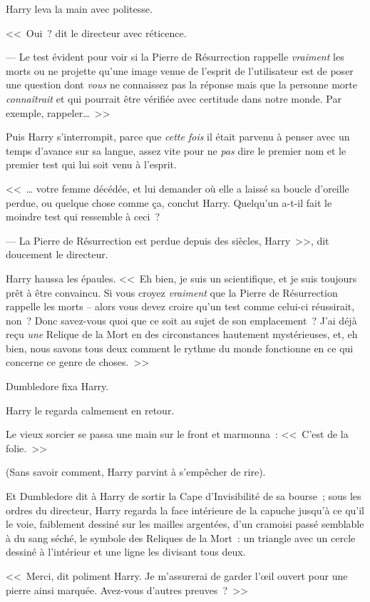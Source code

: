 Harry leva la main avec politesse.

<<~Oui~? dit le directeur avec réticence.

--- Le test évident pour voir si la Pierre de Résurrection rappelle \emph{vraiment} les morts ou ne projette qu'une image venue de l'esprit de l'utilisateur est de poser une question dont \emph{vous} ne connaissez pas la réponse mais que la personne morte \emph{connaîtrait} et qui pourrait être vérifiée avec certitude dans notre monde. Par exemple, rappeler…~>>

Puis Harry s'interrompit, parce que \emph{cette fois} il était parvenu à penser avec un temps d'avance sur sa langue, assez vite pour ne \emph{pas} dire le premier nom et le premier test qui lui soit venu à l'esprit.

<<~… votre femme décédée, et lui demander où elle a laissé sa boucle d'oreille perdue, ou quelque chose comme ça, conclut Harry. Quelqu'un a-t-il fait le moindre test qui ressemble à ceci~?

--- La Pierre de Résurrection est perdue depuis des siècles, Harry~>>, dit doucement le directeur.

Harry haussa les épaules. <<~Eh bien, je suis un scientifique, et je suis toujours prêt à être convaincu. Si vous croyez \emph{vraiment} que la Pierre de Résurrection rappelle les morts -- alors vous devez croire qu'un test comme celui-ci réussirait, non~? Donc savez-vous quoi que ce soit au sujet de son emplacement~? J'ai déjà reçu \emph{une} Relique de la Mort en des circonstances hautement mystérieuses, et, eh bien, nous savons tous deux comment le rythme du monde fonctionne en ce qui concerne ce genre de choses.~>>

Dumbledore fixa Harry.

Harry le regarda calmement en retour.

Le vieux sorcier se passa une main sur le front et marmonna~: <<~C'est de la folie.~>>

(Sans savoir comment, Harry parvint à s'empêcher de rire).

Et Dumbledore dit à Harry de sortir la Cape d'Invisibilité de sa bourse~; sous les ordres du directeur, Harry regarda la face intérieure de la capuche jusqu'à ce qu'il le voie, faiblement dessiné sur les mailles argentées, d'un cramoisi passé semblable à du sang séché, le symbole des Reliques de la Mort~: un triangle avec un cercle dessiné à l'intérieur et une ligne les divisant tous deux.

<<~Merci, dit poliment Harry. Je m'assurerai de garder l'œil ouvert pour une pierre ainsi marquée. Avez-vous d'autres preuves~?~>>

